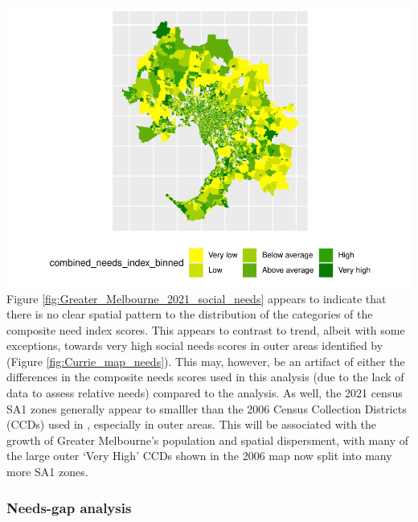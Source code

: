\documentclass[preprint, 3p,
authoryear]{elsarticle} %
\begin{document}
\includegraphics{Leveraging_GTFS_to_assess_transit_supply_Transport_Geography_files/figure-latex/Greater_Melbourne_2021_social_needs-1.pdf}
Figure \ref{fig:Greater_Melbourne_2021_social_needs} appears to indicate
that there is no clear spatial pattern to the distribution of the
categories of the composite need index scores. This appears to contrast
to trend, albeit with some exceptions, towards very high social needs
scores in outer areas identified by \citet{currie2010identifying}
(Figure \ref{fig:Currie_map_needs}). This may, however, be an artifact
of either the differences in the composite needs scores used in this
analysis (due to the lack of data to assess relative needs) compared to
the \citet{currie2010identifying} analysis. As well, the 2021 census SA1
zones generally appear to smalller than the 2006 Census Collection
Districts (CCDs) used in \citet{currie2010identifying}, especially in
outer areas. This will be associated with the growth of Greater
Melbourne's population and spatial dispersment, with many of the large
outer `Very High' CCDs shown in the 2006 map now split into many more
SA1 zones.

\subsubsection{Needs-gap analysis}\label{needs-gap-analysis}
\end{document}
